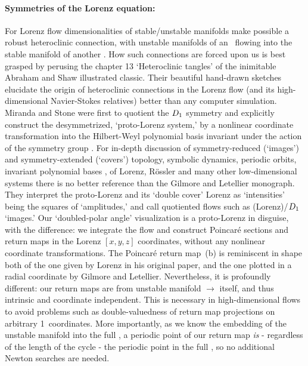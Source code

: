 %
\paragraph{Symmetries of the Lorenz equation:}\label{rem:LorenzSymm}

For Lorenz flow
dimensionalities of stable/unstable manifolds
make possible a
robust heteroclinic connection,
with unstable manifolds of an \eqv\ flowing into the
stable manifold of another \eqva.
How such connections are forced upon us is
best grasped by perusing the chapter 13 `Heteroclinic tangles'
of the inimitable
Abraham and Shaw illustrated classic.
Their beautiful hand-drawn sketches elucidate the origin
of heteroclinic connections in the Lorenz flow (and its high-dimensional
Navier-Stokes relatives) better than any computer simulation.
Miranda and Stone were first to
quotient the $D_1$ symmetry and explicitly construct
the desymmetrized, `proto-Lorenz system,'
by a nonlinear coordinate transformation into the Hilbert-Weyl
polynomial basis
invariant under the action of the symmetry group%
.
For in-depth discussion of symmetry-reduced (`images')
and symmetry-extended (`covers')
topology, symbolic dynamics, periodic orbits,
invariant polynomial bases \etc, of
Lorenz, R\"ossler and many other low-dimensional systems
there is
no better reference than the
Gilmore and Letellier monograph.
%
They interpret the proto-Lorenz and its `double
cover' Lorenz as `intensities' being
the squares of `amplitudes,' and call quotiented
flows such as (Lorenz)/$D_1$ `images.'
Our `doubled-polar angle' visualization
is a proto-Lorenz in disguise, with the difference: we
integrate the flow and construct Poincar\'e sections and
return maps in the Lorenz $[x,y,z]$ coordinates, without
any nonlinear coordinate transformations.
The Poincar\'e
return map \,(b) is reminiscent
in shape both of the one given by Lorenz
in his original paper, and the one plotted in
a radial coordinate by Gilmore and Letellier.
Nevertheless, it is profoundly different:
our return maps are
from unstable manifold $\to$ itself,
and thus intrinsic and coordinate independent. This is necessary
in high-dimensional flows
to avoid problems such as double-valuedness of return map projections
on arbitrary 1\dmn\ coordinates. More importantly, as we know the embedding
of the unstable manifold into the full \statesp, a periodic point
of our return map \emph{is} - regardless of the
length of the cycle -  the periodic point in the full  \statesp,
so no additional Newton searches are needed.
